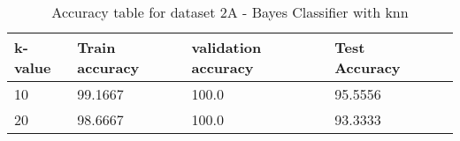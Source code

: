 \def\arraystretch{1.25}
\begin{table}[H]
\centering
\begin{tabular}{l l l l l}
\hline
\hline
\textbf{k-value} & \textbf{Train accuracy} & \textbf{validation accuracy} & \textbf{Test Accuracy}\\
\hline
\hline
10 & 99.1667 & 100.0 & 95.5556 \\
20 & 98.6667 & 100.0 & 93.3333 \\
\hline
\end{tabular}
\setcounter{table}{3}
\caption{Accuracy table for dataset 2A - Bayes Classifier with knn}
\end{table}